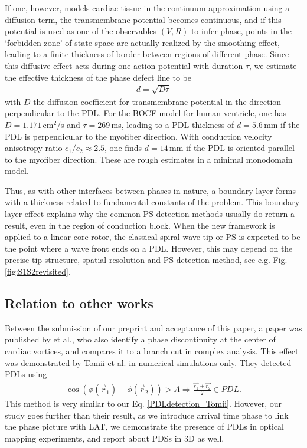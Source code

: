 \documentclass{article}
\begin{document}
If one, however, models cardiac tissue in the continuum approximation using a diffusion term, the transmembrane potential becomes continuous, and if this potential is used as one of the observables $(V,R)$ to infer phase, points in the `forbidden zone' of state space are actually realized by the smoothing effect, leading to a finite thickness of border between regions of different phase. Since this diffusive effect acts during one action potential with duration $\tau$, we estimate the effective thickness of the phase defect line to be
\begin{align}
    d = \sqrt{D \tau}
\end{align}
with $D$ the diffusion coefficient for transmembrane potential in the direction perpendicular to the PDL. For the BOCF model for human ventricle, one has $D=1.171\,$cm$^2/$s and $\tau = 269\,$ms, leading to a PDL thickness of $d=5.6$\,mm if the PDL is perpendicular to the myofiber direction. With conduction velocity anisotropy ratio $c_1/c_2 \approx 2.5$, one finds $d=14\,$mm if the PDL is oriented parallel to the myofiber direction. These are rough estimates in a minimal monodomain model. 

Thus, as with other interfaces between phases in nature, a boundary layer forms with a thickness related to fundamental constants of the problem. This boundary layer effect explains why the common PS detection methods usually do return a result, even in the region of conduction block. When the new framework is applied to a linear-core rotor, the classical spiral wave tip or PS is expected to be the point where a wave front ends on a PDL. However, this may depend on the precise tip structure, spatial resolution and PS detection method, see e.g. Fig. \ref{fig:S1S2revisited}. 

\subsection{Relation to other works}

Between the submission of our preprint \cite{Arno:2021arxiv} and acceptance of this paper, a paper was published by \cite{Tomii:2021} et al., who also identify a phase discontinuity at the center of cardiac vortices, and compares it to a branch cut in complex analysis. This effect was demonstrated by Tomii et al. in numerical simulations only. They detected PDLs using
\begin{align}
\cos ( \phi(\vec{r}_1) - \phi(\vec{r}_2)) > A     \Rightarrow \frac{\vec{r_1} + \vec{r_2}}{2} \in PDL.  \label{PDLdetection_Tomii}
\end{align}
This method is very similar to our Eq. \eqref{PDLdetection_Tomii}. However, our study goes further than their result, as we introduce arrival time phase to link the phase picture with LAT, we demonstrate the presence of PDLs in optical mapping experiments, and report about PDSs in 3D as well. 
\end{document}
